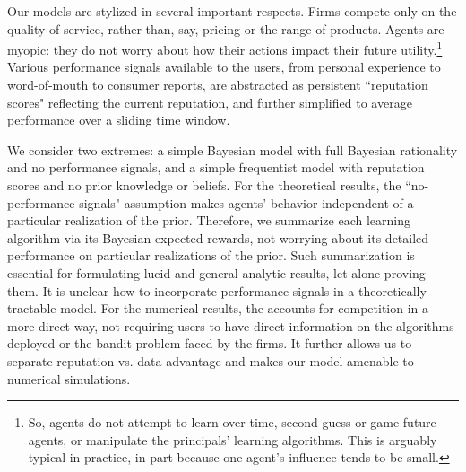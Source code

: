 


Our models are stylized in several important  respects. Firms compete only on the quality of service, rather than, say, pricing or the range of products. Agents are myopic: they do not worry about how their actions impact their future utility.\footnote{So, agents do not attempt to learn over time, second-guess or game future agents, or manipulate the principals' learning algorithms. This is arguably typical in practice, in part because one agent's influence tends to be small.}  Various performance signals available to the users, from personal experience to word-of-mouth to consumer reports, are abstracted as persistent ``reputation scores" reflecting the current reputation, and further simplified to average performance over a sliding time window. 

We consider two extremes: a simple Bayesian model with full Bayesian rationality and no performance signals, and a simple frequentist model with reputation scores and no prior knowledge or beliefs. For the theoretical results, the ``no-performance-signals" assumption makes agents' behavior independent of a particular realization of the prior. Therefore, we summarize each learning algorithm via its Bayesian-expected rewards, not worrying about its detailed performance on particular realizations of the prior.  Such summarization is essential for formulating lucid and general analytic results, let alone proving them. It is unclear how to incorporate performance signals in a theoretically tractable model. For the numerical results, the \ExptsModel accounts for competition in a more direct way,
not requiring users to have direct information on the algorithms deployed or the bandit problem faced by the firms. It further allows us to separate reputation vs. data advantage and makes our model amenable to numerical simulations.



